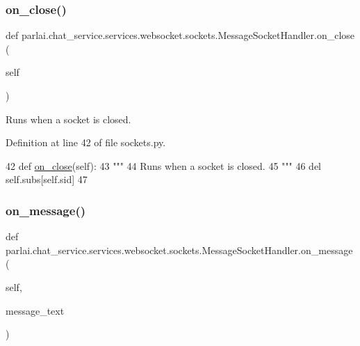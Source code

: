 \subsubsection{\texorpdfstring{on\+\_\+close()}{on\_close()}}
{\footnotesize\ttfamily def parlai.\+chat\+\_\+service.\+services.\+websocket.\+sockets.\+Message\+Socket\+Handler.\+on\+\_\+close (\begin{DoxyParamCaption}\item[{}]{self }\end{DoxyParamCaption})}

\begin{DoxyVerb}Runs when a socket is closed.
\end{DoxyVerb}
 

Definition at line 42 of file sockets.\+py.


\begin{DoxyCode}
42     \textcolor{keyword}{def }\hyperlink{namespaceparlai_1_1chat__service_1_1services_1_1browser__chat_1_1client_add94040308bad4454cbcf4c8010d0c51}{on\_close}(self):
43         \textcolor{stringliteral}{"""}
44 \textcolor{stringliteral}{        Runs when a socket is closed.}
45 \textcolor{stringliteral}{        """}
46         del self.subs[self.sid]
47 
\end{DoxyCode}
\mbox{\label{classparlai_1_1chat__service_1_1services_1_1websocket_1_1sockets_1_1MessageSocketHandler_a6e45176bf280b1c9b90b93f933af5e00}} 
\subsubsection{\texorpdfstring{on\+\_\+message()}{on\_message()}}
{\footnotesize\ttfamily def parlai.\+chat\+\_\+service.\+services.\+websocket.\+sockets.\+Message\+Socket\+Handler.\+on\+\_\+message (\begin{DoxyParamCaption}\item[{}]{self,  }\item[{}]{message\+\_\+text }\end{DoxyParamCaption})}

